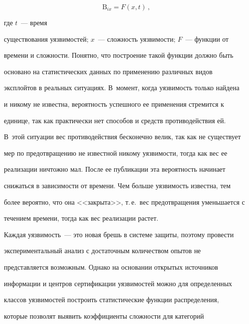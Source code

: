 \noindent


$$


\mathrm{B}_{ix}= F(x,t)\,,


$$





\vspace*{-3pt}





\noindent


где $t$~--- время 


существования уязвимостей; $x$~--- сложность уязвимости; $F$~--- функции от 


времени и сложности. Понятно, что построение такой функции должно быть 


основано на статистических данных по применению различных видов 


эксплойтов в реальных ситуациях. В~момент, когда уязвимость только найдена 


и никому не известна, вероятность успешного ее применения стремится к 


единице, так как практически нет способов и средств противодействия ей. 


В~этой ситуации вес противодействия бесконечно велик, так как не существует 


мер по предотвращению не известной никому уязвимости, тогда как вес ее 


реализации ничтожно мал. После ее публикации эта вероятность начинает 


снижаться в зависимости от времени. Чем больше уязвимость известна, тем 


более вероятно, что она <<закрыта>>, т.\,е.\ вес предотвращения уменьшается с 


течением времени, тогда как вес реализации растет. 


     


     Каждая уязвимость~--- это новая брешь в системе защиты, поэтому провести 


экспериментальный анализ с достаточным количеством опытов не 


представляется возможным. Однако на основании открытых источников 


информации и центров сертификации уязвимостей можно для определенных 


классов уязвимостей построить статистические функции распределения, 


которые позволят выявить коэффициенты сложности для категорий 



